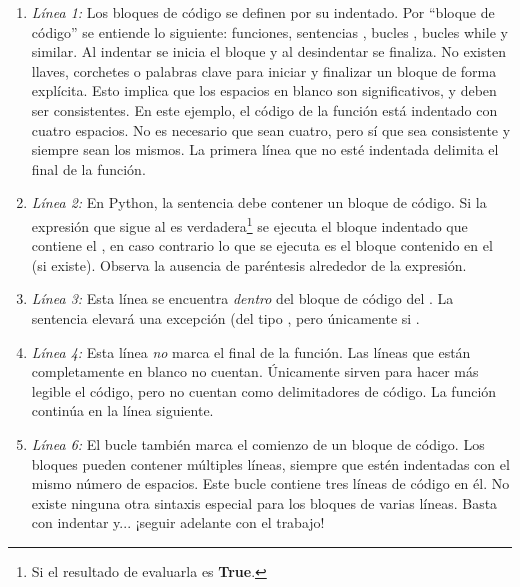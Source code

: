 \begin{enumerate}

\item \emph{Línea 1:} Los bloques de código se definen por su indentado. Por ``bloque de código'' se entiende lo siguiente: funciones, sentencias , bucles , bucles {while} y similar. Al indentar se inicia el bloque y al desindentar se finaliza. No existen llaves, corchetes o palabras clave para iniciar y finalizar un bloque de forma explícita. Esto implica que los espacios en blanco son significativos, y deben ser consistentes. En este ejemplo, el código de la función está indentado con cuatro espacios. No es necesario que sean cuatro, pero sí que sea consistente y siempre sean los mismos. La primera línea que no esté indentada delimita el final de la función.

\item \emph{Línea 2:} En Python, la sentencia  debe contener un bloque de código. Si la expresión que sigue al  es verdadera\footnote{Si el resultado de evaluarla es \textbf{True}.} se ejecuta el bloque indentado que contiene el , en caso contrario lo que se ejecuta es el bloque contenido en el  (si existe). Observa la ausencia de paréntesis alrededor de la expresión.

\item \emph{Línea 3:} Esta línea se encuentra \emph{dentro} del bloque de código del . La sentencia  elevará una excepción (del tipo , pero únicamente si .

\item \emph{Línea 4:} Esta línea \emph{no} marca el final de la función. Las líneas que están completamente en blanco no cuentan. Únicamente sirven para hacer más legible el código, pero no cuentan como delimitadores de código. La función continúa en la línea siguiente.

\item \emph{Línea 6:} El bucle  también marca el comienzo de un bloque de código. Los bloques pueden contener múltiples líneas, siempre que estén indentadas con el mismo número de espacios. Este bucle  contiene tres líneas de código en él. No existe ninguna otra sintaxis especial para los bloques de varias líneas. Basta con indentar y... ¡seguir adelante con el trabajo!

\end{enumerate}


